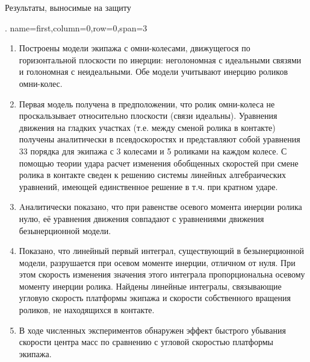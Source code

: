 \begin{myposter}{
    Результаты, выносимые на защиту
}

    \headerbox
    {.}
    {name=first,column=0,row=0,span=3}
    {
        {
        \fontsize{0.7cm}{0.5cm}\selectfont
        \bf
            \vspace{10pt}

                \begin{enumerate}
                
                        \item {
                            Построены модели экипажа с омни-колесами, движущегося по горизонтальной плоскости по инерции: неголономная с идеальными связями и голономная с неидеальными. Обе модели учитывают инерцию роликов омни-колес.
                        }
                
                        \item {
                            Первая модель получена в предположении, что ролик омни-колеса не проскальзывает относительно плоскости (связи идеальны). Уравнения движения на гладких участках  (т.е. между сменой ролика в контакте) получены аналитически в псевдоскоростях и представляют собой уравнения 33 порядка для экипажа с 3 колесами и 5 роликами на каждом колесе. С помощью теории удара расчет изменения обобщенных скоростей при смене ролика в контакте сведен к решению системы линейных алгебраических уравнений, имеющей единственное решение в т.ч. при кратном ударе.
                        }
                
                        \item {
                            Aналитически показано, что при равенстве осевого момента инерции ролика нулю, её уравнения движения совпадают с уравнениями движения безынерционной модели.
                        }
                
                        \item {
                            Показано, что линейный первый интеграл, существующий в безынерционной модели, разрушается при осевом моменте инерции, отличном от нуля. При этом скорость изменения значения этого интеграла пропорциональна осевому моменту инерции ролика. Найдены линейные интегралы, связывающие угловую скорость платформы экипажа и скорости собственного вращения роликов, не находящихся в контакте.
                        }
                        
                        \item {
                            В ходе численных экспериментов обнаружен эффект быстрого убывания скорости центра масс по сравнению с угловой скоростью платформы экипажа.
                        }
                        

\end{enumerate}}}
\end{myposter}
